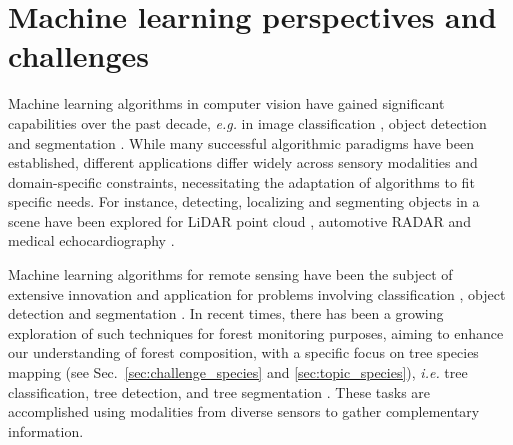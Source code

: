\documentclass{CUP-JNL-DTM}%
\theoremstyle{definition}
\numberwithin{equation}{section}
\begin{document}
\section{Machine learning perspectives and challenges}
\label{sec:ml_challenges}


Machine learning algorithms in computer vision have gained significant capabilities over the past decade, \textit{e.g.} in image classification \cite{krizhevsky_imagenet_2012, simonyan_very_2015, szegedy_going_2015, szegedy_rethinking_2016, he_deep_2016, szegedy_inception-v4_2017, hu_squeeze-and-excitation_2018, dosovitskiy_image_2021,liu_swin_2021, touvron_training_2021}, object detection \cite{ren_faster_2015, redmon_you_2016, redmon_yolov3_2018, liu_ssd_2016, he_mask_2017, li_mask_2023} and segmentation \cite{long_fully_2015, ronneberger_u-net_2015, lin_focal_2017, he_mask_2017, chen_encoder-decoder_2018, cheng_masked-attention_2022, kirillov_segment_2023}. 
%
While many successful algorithmic paradigms have been established, different applications differ widely across sensory modalities and domain-specific constraints, necessitating the adaptation of algorithms to fit specific needs.
For instance, detecting, localizing and segmenting objects in a scene have been explored for LiDAR point cloud \cite{yang_pixor_2018}, automotive RADAR  \cite{ouaknine_multi-view_2021} and medical echocardiography \cite{leclerc_deep_2019}.

Machine learning algorithms for remote sensing have been the subject of extensive innovation and application \cite{campsvalls_deep_2021, ma_deep_2019} for problems involving classification \cite{cheng_remote_2020, maxwell_implementation_2018}, object detection \cite{cheng_survey_2016, li_object_2020} and segmentation \cite{yuan_review_2021, hoeser_object_2020}.
%
In recent times, there has been a growing exploration of such techniques for forest monitoring purposes, aiming to enhance our understanding of forest composition, with a specific focus on tree species mapping (see Sec.~\ref{sec:challenge_species} and \ref{sec:topic_species}), \textit{i.e.} tree classification, tree detection, and tree segmentation \cite{fassnacht_review_2016, kattenborn_review_2021, diez_deep_2021, michalowska_review_2021}. These tasks are accomplished using modalities from diverse sensors to gather complementary information.
\end{document}
